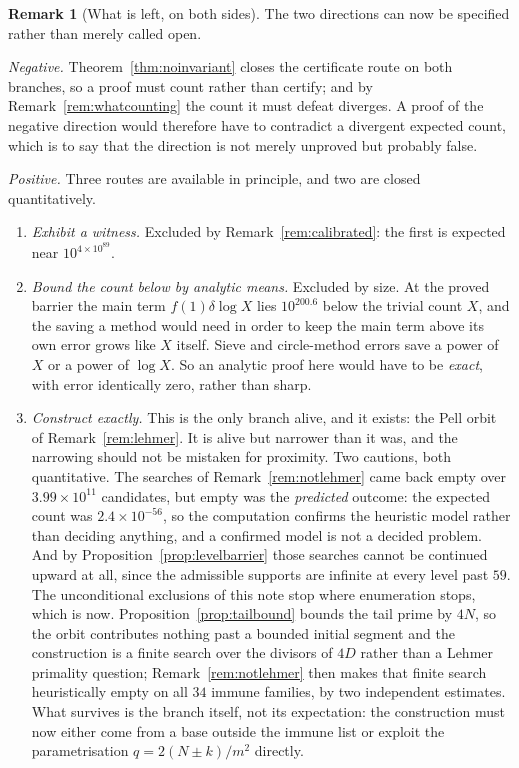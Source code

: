 \documentclass[11pt]{article}
\theoremstyle{definition}
\newtheorem{remark}[theorem]{Remark}
\begin{document}
\begin{remark}[What is left, on both sides]\label{rem:whatisleft}
The two directions can now be specified rather than merely called open.

\emph{Negative.} Theorem~\ref{thm:noinvariant} closes the certificate route on both branches, so a
proof must count rather than certify; and by Remark~\ref{rem:whatcounting} the count it must defeat
diverges. A proof of the negative direction would therefore have to contradict a divergent expected
count, which is to say that the direction is not merely unproved but probably false.

\emph{Positive.} Three routes are available in principle, and two are closed quantitatively.
\begin{enumerate}[label=\textup{(\alph*)},leftmargin=2.2em]
\item \emph{Exhibit a witness.} Excluded by Remark~\ref{rem:calibrated}: the first is expected near
$10^{4\times10^{89}}$.
\item \emph{Bound the count below by analytic means.} Excluded by size. At the proved barrier the
main term $f(1)\delta\log X$ lies $10^{200.6}$ below the trivial count $X$, and the saving a method
would need in order to keep the main term above its own error grows like $X$ itself. Sieve and
circle-method errors save a power of $X$ or a power of $\log X$. So an analytic proof here would
have to be \emph{exact}, with error identically zero, rather than sharp.
\item \emph{Construct exactly.} This is the only branch alive, and it exists: the Pell orbit of
Remark~\ref{rem:lehmer}. It is alive but narrower than it was, and the narrowing should not be
mistaken for proximity. Two cautions, both quantitative. The searches of
Remark~\ref{rem:notlehmer} came back empty over $3.99\times10^{11}$ candidates, but empty was the
\emph{predicted} outcome: the expected count was $2.4\times10^{-56}$, so the computation confirms the
heuristic model rather than deciding anything, and a confirmed model is not a decided problem. And by
Proposition~\ref{prop:levelbarrier} those searches cannot be continued upward at all, since the
admissible supports are infinite at every level past $59$. The unconditional exclusions of this note
stop where enumeration stops, which is now.
Proposition~\ref{prop:tailbound} bounds the tail prime by $4N$, so the orbit contributes nothing past
a bounded initial segment and the construction is a finite search over the divisors of $4D$ rather
than a Lehmer primality question; Remark~\ref{rem:notlehmer} then makes that finite search
heuristically empty on all $34$ immune families, by two independent estimates. What survives is the
branch itself, not its expectation: the construction must now either come from a base outside the
immune list or exploit the parametrisation $q=2(N\pm k)/m^2$ directly.
\end{enumerate}


\end{remark}
\end{document}

